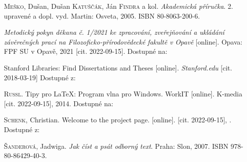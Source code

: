 \begin{thebibliography}{99}
\textsc{Meško}, Dušan, Dušan \textsc{Katuščák}, Ján \textsc{Findra} a kol. \emph{Akademická příručka}. 2. upravené a dopl. vyd. Martin: Osveta, 2005. ISBN 80-8063-200-6.

\emph{Metodický pokyn děkana č. 1/2021 ke zpracování, zveřejňování a ukládání závěrečných prací na Filozoficko-přírodovědecké fakultě v Opavě} [online]. Opava: FPF SU v Opavě, 2021 [cit. 2022-09-15]. Dostupné na: 

Stanford Libraries: Find Dissertations and Theses [online]. \emph{Stanford.edu} [cit. 2018-03-19] Dostupné z: 


\textsc{Russl}. Tipy pro LaTeX: Program vlna pro Windows. WorkIT [online]. K-media [cit. 2022-09-15], 2014. Dostupné na:

\textsc{Schenk}, Christian. Welcome to the \MikTeX{} project page. \MikTeX{} [online]. [cit. 2022-09-15], . Dostupné z: 

\textsc{Šanderová}, Jadwiga. \emph{Jak číst a psát odborný text}. Praha: Slon, 2007. ISBN 978-80-86429-40-3.



\end{thebibliography}



